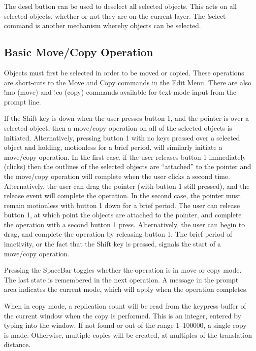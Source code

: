 The {\cb desel} button can be used to deselect all selected objects. 
This acts on all selected objects, whether or not they are on the
current layer.  The {\cb !select} command is another mechanism whereby
objects can be selected.

\subsection{Basic Move/Copy Operation}

Objects must first be selected in order to be moved or copied.  These
operations are short-cuts to the {\cb Move} and {\cb Copy} commands in
the {\cb Edit Menu}.  There are also {\cb !mo} (move) and {\cb !co}
(copy) commands available for text-mode input from the prompt line.

If the {\kb Shift} key is down when the user presses button 1, and the
pointer is over a selected object, then a move/copy operation on all
of the selected objects is initiated.  Alternatively, pressing button
1 with no keys pressed over a selected object and holding, motionless
for a brief period, will similarly initiate a move/copy operation.  In
the first case, if the user releases button 1 immediately (clicks)
then the outlines of the selected objects are ``attached'' to the
pointer and the move/copy operation will complete when the user clicks
a second time.  Alternatively, the user can drag the pointer (with
button 1 still pressed), and the release event will complete the
operation.  In the second case, the pointer must remain motionless
with button 1 down for a brief period.  The user can release button 1,
at which point the objects are attached to the pointer, and complete
the operation with a second button 1 press.  Alternatively, the user
can begin to drag, and complete the operation by releasing button 1. 
The brief period of inactivity, or the fact that the {\kb Shift} key
is pressed, signals the start of a move/copy operation.

Pressing the {\kb SpaceBar} toggles whether the operation is in move
or copy mode.  The last state is remembered in the next operation.  A
message in the prompt area indicates the current mode, which will
apply when the operation completes.

When in copy mode, a replication count will be read from the keypress
buffer of the current window when the copy is performed.  This is an
integer, entered by typing into the window.  If not found or out of
the range 1--100000, a single copy is made.  Otherwise, multiple
copies will be created, at multiples of the translation distance.

